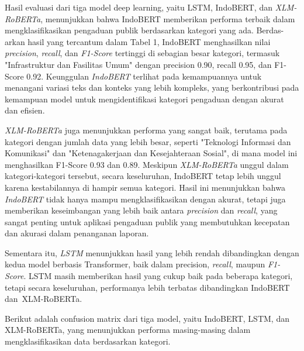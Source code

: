 \documentclass[12pt,a4paper]{article}
\begin{document}
\begin{adjustwidth}{3em}{0pt} 
\hspace{0.5cm} Hasil evaluasi dari tiga model deep learning, yaitu LSTM, IndoBERT, dan \textit{XLM-RoBERTa}, menunjukkan bahwa IndoBERT memberikan performa terbaik dalam mengklasifikasikan pengaduan publik berdasarkan kategori yang ada. Berdas-arkan hasil yang tercantum dalam Tabel 1, IndoBERT menghasilkan nilai \textit{precision}, \textit{recall}, dan \textit{F1-Score }tertinggi di sebagian besar kategori, termasuk "Infrastruktur dan Fasilitas Umum" dengan precision 0.90, recall 0.95, dan F1-Score 0.92. Keunggulan \textit{IndoBERT} terlihat pada kemampuannya untuk menangani variasi teks dan konteks yang lebih kompleks, yang berkontribusi pada kemampuan model untuk mengidentifikasi kategori pengaduan dengan akurat dan efisien.

\hspace{0.5cm} \textit{XLM-RoBERTa} juga menunjukkan performa yang sangat baik, terutama pada kategori dengan jumlah data yang lebih besar, seperti "Teknologi Informasi dan Komunikasi" dan "Ketenagakerjaan dan Kesejahteraan Sosial", di mana model ini menghasilkan F1-Score 0.93 dan 0.89. Meskipun \textit{XLM-RoBERTa }unggul dalam kategori-kategori tersebut, secara keseluruhan, IndoBERT tetap lebih unggul karena kestabilannya di hampir semua kategori. Hasil ini menunjukkan bahwa \textit{IndoBERT} tidak hanya mampu mengklasifikasikan dengan akurat, tetapi juga memberikan keseimbangan yang lebih baik antara \textit{precision} dan \textit{recall}, yang sangat penting untuk aplikasi pengaduan publik yang membutuhkan kecepatan dan akurasi dalam penanganan laporan.

\hspace{0.5cm} Sementara itu, \textit{LSTM} menunjukkan hasil yang lebih rendah dibandingkan dengan kedua model berbasis Transformer, baik dalam precision, \textit{recall}, maupun \textit{F1-Score}. LSTM masih memberikan hasil yang cukup baik pada beberapa kategori, tetapi secara keseluruhan, performanya lebih terbatas dibandingkan IndoBERT dan XLM-RoBERTa.\end{adjustwidth}

\begin{adjustwidth}{3em}{0pt} 
    \hspace{0.5cm} Berikut adalah confusion matrix dari tiga model, yaitu IndoBERT, LSTM, dan XLM-RoBERTa, yang menunjukkan performa masing-masing dalam mengklasifikasikan data berdasarkan kategori.
\end{adjustwidth}
\end{document}
